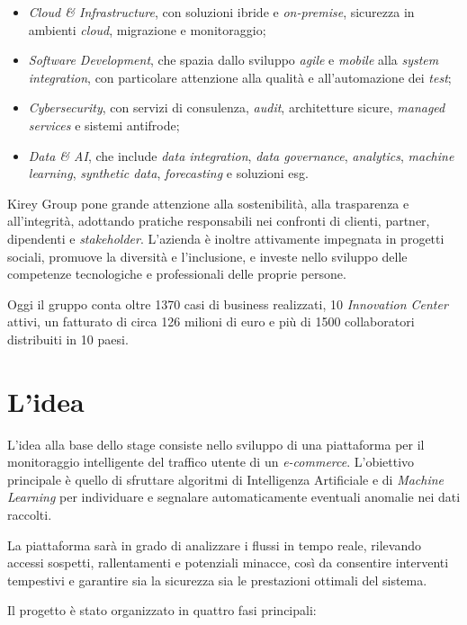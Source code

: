 \begin{itemize}
    \item \emph{Cloud \& Infrastructure}, con soluzioni ibride e \emph{on-premise}, sicurezza in ambienti \emph{cloud}, migrazione e monitoraggio;
    \item \emph{Software Development}, che spazia dallo sviluppo \emph{agile} e \emph{mobile} alla \emph{system integration}, con particolare attenzione alla qualità e all'automazione dei \emph{test};
    \item \emph{Cybersecurity}, con servizi di consulenza, \emph{audit}, architetture sicure, \emph{managed services} e sistemi antifrode;
    \item \emph{Data \& AI}, che include \emph{data integration}, \emph{data governance}, \emph{analytics}, \emph{machine learning}, \emph{synthetic data}, \emph{forecasting} e soluzioni \gls{esg}.
\end{itemize}

Kirey Group pone grande attenzione alla sostenibilità, alla trasparenza e all'integrità, adottando pratiche responsabili nei confronti di clienti, partner, dipendenti e \emph{stakeholder}. 
L'azienda è inoltre attivamente impegnata in progetti sociali, promuove la diversità e l'inclusione, e investe nello sviluppo delle competenze tecnologiche e professionali delle proprie persone.

Oggi il gruppo conta oltre 1370 casi di business realizzati, 10 \emph{Innovation Center} attivi, un fatturato di circa 126 milioni di euro e più di 1500 collaboratori distribuiti in 10 paesi.


\section{L'idea}

L'idea alla base dello stage consiste nello sviluppo di una piattaforma per il monitoraggio intelligente del traffico utente di un \emph{e-commerce}. L'obiettivo principale è quello di sfruttare algoritmi di Intelligenza Artificiale e di \emph{Machine Learning} per individuare e segnalare automaticamente eventuali anomalie nei dati raccolti.

La piattaforma sarà in grado di analizzare i flussi in tempo reale, rilevando accessi sospetti, rallentamenti e potenziali minacce, così da consentire interventi tempestivi e garantire sia la sicurezza sia le prestazioni ottimali del sistema.

Il progetto è stato organizzato in quattro fasi principali:

